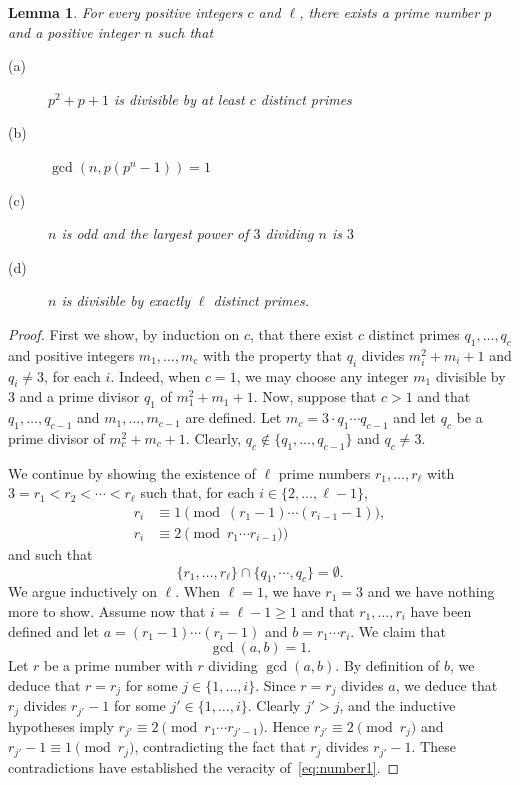 \documentclass{amsart}
\newtheorem{lemma}[theorem]{Lemma}
\begin{document}
\begin{lemma}\label{number theory3}
For every positive integers $c$ and $\ell$, there exists a prime number $p$ and a positive integer $n$ such that
\begin{description}
\item[(a)] $p^2+p+1$ is divisible by at least $c$ distinct primes
\item[(b)]$\gcd(n,p(p^n-1))=1$
\item[(c)] $n$ is odd and  the largest power of $3$ dividing $n$ is $3$
\item[(d)] $n$ is divisible by exactly $\ell$ distinct primes.
\end{description}
\end{lemma}
\begin{proof}
First we show, by induction on $c$, that there exist $c$ distinct primes $q_1,\ldots,q_c$ and positive integers $m_1,\ldots,m_c$ with the property that $q_i$ divides $m_i^2+m_i+1$ and $q_i \neq 3$, for each $i$.
  Indeed, when $c=1$, we may choose any integer $m_1$ divisible by $3$ and a prime divisor $q_1$ of $m_1^2 + m_1 +1$.
  Now, suppose that $c>1$ and that $q_1,\ldots,q_{c-1}$ and $m_1,\ldots,m_{c-1}$ are defined.
  Let $m_c=3\cdot q_1\cdots q_{c-1}$ and let $q_c$ be a prime divisor of $m_c^2+m_c+1$. Clearly, $q_c\notin\{q_1,\ldots,q_{c-1}\}$ and $q_c \neq 3$.


We continue by  showing the existence of $\ell$ prime numbers $r_1,\ldots,r_\ell$  with $3=r_{1}<r_2<\cdots<r_\ell$ such that, for each $i\in \{2,\ldots,\ell-1\}$,
\begin{align}\label{today}
r_i&\equiv 1\pmod {(r_1-1)\cdots (r_{i-1}-1)},\\\label{tomorrow}
r_i&\equiv 2\pmod{r_1\cdots r_{i-1})}
\end{align}
and such that $$\{r_1,\ldots,r_\ell\}\cap \{q_1,\cdots,q_c\}=\emptyset.$$
We argue inductively on $\ell$. When $\ell=1$, we have $r_1=3$ and we have nothing more to show. Assume now that $i = \ell -1 \ge 1$ and that $r_1,\ldots,r_i$ have been defined and let $a=(r_1-1)\cdots(r_i-1)$ and $b=r_1\cdots r_i$. We claim that
\begin{equation}\label{eq:number1}
\gcd(a,b)=1.
\end{equation}
Let $r$ be a prime number with $r$ dividing $\gcd(a,b)$. By definition of $b$, we deduce that $r=r_j$ for some $j\in \{1,\ldots,i\}$. Since $r=r_j$ divides $a$, we deduce that $r_j$ divides $r_{j'}-1$ for some $j'\in \{1,\ldots,i\}$. Clearly  $j'>j$, and the  inductive hypotheses imply $r_{j'}\equiv 2\pmod{r_1\cdots r_{j'-1}}$. Hence $r_{j'}\equiv 2\pmod{r_{j}}$ and $r_{j'}-1\equiv 1\pmod{r_j}$, contradicting the fact that $r_j$ divides $r_{j'}-1$. These contradictions have established the veracity of~\eqref{eq:number1}.


\end{proof}
\end{document}
